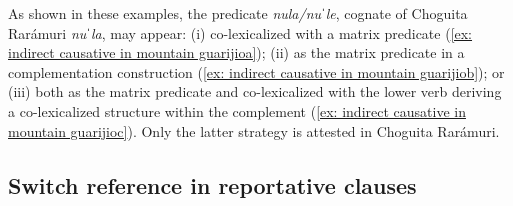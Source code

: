     \label{ex: indirect causative in mountain guarijioa}
        \label{ex: indirect causative in mountain guarijiob}
            \label{ex: indirect causative in mountain guarijioc}
    \z
\z

As shown in these examples, the predicate \textit{nula/nuˈle}, cognate of Choguita Rarámuri \textit{nuˈla}, may appear: (i) co-lexicalized with a matrix predicate (\ref{ex: indirect causative in mountain guarijioa}); (ii) as the matrix predicate in a complementation construction (\ref{ex: indirect causative in mountain guarijiob}); or (iii) both as the matrix predicate and co-lexicalized with the lower verb deriving a co-lexicalized structure within the complement (\ref{ex: indirect causative in mountain guarijioc}). Only the latter strategy is attested in Choguita Rarámuri.

\subsection{Switch reference in reportative clauses}
\label{subsec: reportative clauses}

